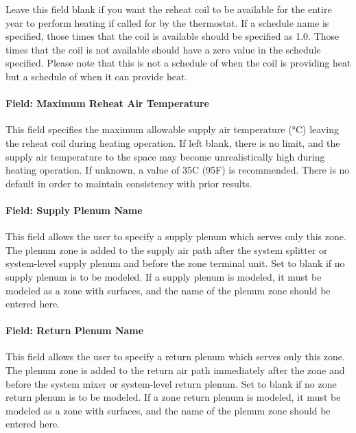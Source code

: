 Leave this field blank if you want the reheat coil to be available for the entire year to perform heating if called for by the thermostat. If a schedule name is specified, those times that the coil is available should be specified as 1.0. Those times that the coil is not available should have a zero value in the schedule specified. Please note that this is not a schedule of when the coil is providing heat but a schedule of when it can provide heat.

\paragraph{Field: Maximum Reheat Air Temperature}\label{field-maximum-reheat-air-temperature-2-000}

This field specifies the maximum allowable supply air temperature (°C) leaving the reheat coil during heating operation. If left blank, there is no limit, and the supply air temperature to the space may become unrealistically high during heating operation. If unknown, a value of 35C (95F) is recommended. There is no default in order to maintain consistency with prior results.

\paragraph{Field: Supply Plenum Name}\label{field-supply-plenum-name-4}

This field allows the user to specify a supply plenum which serves only this zone. The plenum zone is added to the supply air path after the system splitter or system-level supply plenum and before the zone terminal unit. Set to blank if no supply plenum is to be modeled. If a supply plenum is modeled, it must be modeled as a zone with surfaces, and the name of the plenum zone should be entered here.

\paragraph{Field: Return Plenum Name}\label{field-return-plenum-name-4}

This field allows the user to specify a return plenum which serves only this zone. The plenum zone is added to the return air path immediately after the zone and before the system mixer or system-level return plenum. Set to blank if no zone return plenum is to be modeled. If a zone return plenum is modeled, it must be modeled as a zone with surfaces, and the name of the plenum zone should be entered here.

